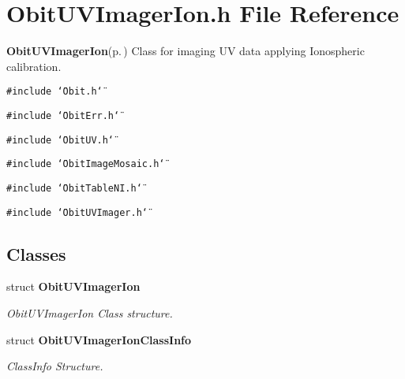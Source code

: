 \section{Obit\-UVImager\-Ion.h File Reference}
\label{ObitUVImagerIon_8h}
{\bf Obit\-UVImager\-Ion}{\rm (p.\,\pageref{structObitUVImagerIon})} Class for imaging UV data applying Ionospheric calibration. 

{\tt \#include \char`\"{}Obit.h\char`\"{}}\par
{\tt \#include \char`\"{}Obit\-Err.h\char`\"{}}\par
{\tt \#include \char`\"{}Obit\-UV.h\char`\"{}}\par
{\tt \#include \char`\"{}Obit\-Image\-Mosaic.h\char`\"{}}\par
{\tt \#include \char`\"{}Obit\-Table\-NI.h\char`\"{}}\par
{\tt \#include \char`\"{}Obit\-UVImager.h\char`\"{}}\par
\subsection*{Classes}
\begin{CompactItemize}
\item 
struct {\bf Obit\-UVImager\-Ion}
\begin{CompactList}\small\item\em Obit\-UVImager\-Ion Class structure. \item\end{CompactList}\item 
struct {\bf Obit\-UVImager\-Ion\-Class\-Info}
\begin{CompactList}\small\item\em Class\-Info Structure. \item\end{CompactList}\end{CompactItemize}
